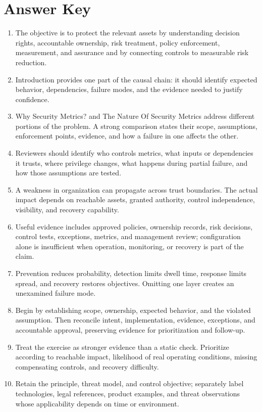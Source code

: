 \documentclass[11pt]{article}
\begin{document}
\section*{Answer Key}
\begin{enumerate}
\item The objective is to protect the relevant assets by understanding decision rights, accountable ownership, risk treatment, policy enforcement, measurement, and assurance and by connecting controls to measurable risk reduction.
\item Introduction provides one part of the causal chain: it should identify expected behavior, dependencies, failure modes, and the evidence needed to justify confidence.
\item Why Security Metrics? and The Nature Of Security Metrics address different portions of the problem. A strong comparison states their scope, assumptions, enforcement points, evidence, and how a failure in one affects the other.
\item Reviewers should identify who controls metrics, what inputs or dependencies it trusts, where privilege changes, what happens during partial failure, and how those assumptions are tested.
\item A weakness in organization can propagate across trust boundaries. The actual impact depends on reachable assets, granted authority, control independence, visibility, and recovery capability.
\item Useful evidence includes approved policies, ownership records, risk decisions, control tests, exceptions, metrics, and management review; configuration alone is insufficient when operation, monitoring, or recovery is part of the claim.
\item Prevention reduces probability, detection limits dwell time, response limits spread, and recovery restores objectives. Omitting one layer creates an unexamined failure mode.
\item Begin by establishing scope, ownership, expected behavior, and the violated assumption. Then reconcile intent, implementation, evidence, exceptions, and accountable approval, preserving evidence for prioritization and follow-up.
\item Treat the exercise as stronger evidence than a static check. Prioritize according to reachable impact, likelihood of real operating conditions, missing compensating controls, and recovery difficulty.
\item Retain the principle, threat model, and control objective; separately label technologies, legal references, product examples, and threat observations whose applicability depends on time or environment.
\end{enumerate}
\end{document}
